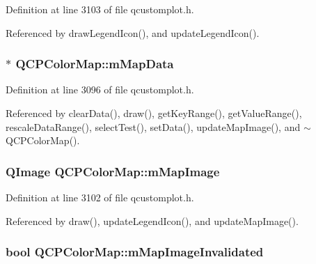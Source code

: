 Definition at line 3103 of file qcustomplot.\+h.



Referenced by draw\+Legend\+Icon(), and update\+Legend\+Icon().

\hypertarget{class_q_c_p_color_map_a8709272aa8f0be3ca111bf3866806f8b}{}
\subsubsection[{m\+Map\+Data}]{$\ast$ Q\+C\+P\+Color\+Map\+::m\+Map\+Data\hspace{0.3cm}{\ttfamily [protected]}}\label{class_q_c_p_color_map_a8709272aa8f0be3ca111bf3866806f8b}


Definition at line 3096 of file qcustomplot.\+h.



Referenced by clear\+Data(), draw(), get\+Key\+Range(), get\+Value\+Range(), rescale\+Data\+Range(), select\+Test(), set\+Data(), update\+Map\+Image(), and $\sim$\+Q\+C\+P\+Color\+Map().

\hypertarget{class_q_c_p_color_map_a66110813b42eca78b64095b2a1f285a0}{}
\subsubsection[{m\+Map\+Image}]{\setlength{\rightskip}{0pt plus 5cm}Q\+Image Q\+C\+P\+Color\+Map\+::m\+Map\+Image\hspace{0.3cm}{\ttfamily [protected]}}\label{class_q_c_p_color_map_a66110813b42eca78b64095b2a1f285a0}


Definition at line 3102 of file qcustomplot.\+h.



Referenced by draw(), update\+Legend\+Icon(), and update\+Map\+Image().

\hypertarget{class_q_c_p_color_map_ac9aea6a5c193d7fa866bc7b26e79ef2c}{}
\subsubsection[{m\+Map\+Image\+Invalidated}]{\setlength{\rightskip}{0pt plus 5cm}bool Q\+C\+P\+Color\+Map\+::m\+Map\+Image\+Invalidated\hspace{0.3cm}{\ttfamily [protected]}}\label{class_q_c_p_color_map_ac9aea6a5c193d7fa866bc7b26e79ef2c}


